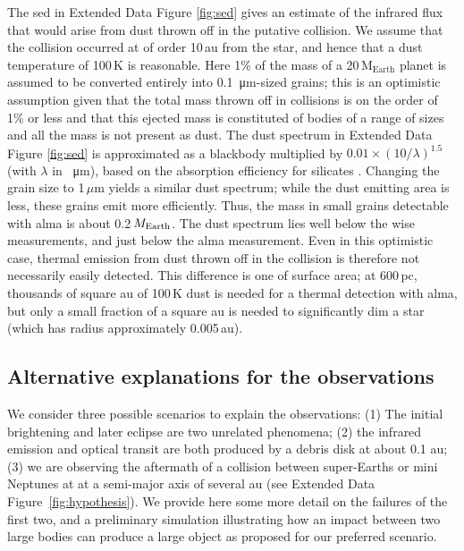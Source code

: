 \documentclass[sn-nature,oneside]{sn-jnl}%
\begin{document}
The  \gls{sed} in Extended Data Figure \ref{fig:sed} gives an estimate of the infrared flux that would arise from dust thrown off in the putative collision.
%
We assume that the collision occurred at of order 10\,au from the star, and hence that a dust temperature of 100\,K is reasonable.
%
Here 1\% of the mass of a 20\,$\mathrm{M_{Earth}}$ planet is assumed to be converted entirely into \SI{0.1}{\micro\metre}-sized grains; this is an optimistic assumption given that the total mass thrown off in collisions is on the order of 1\% or less \citep{2012ApJ...745...79L} and that this ejected mass is constituted of bodies of a range of sizes and all the mass is not present as dust.
%
The dust spectrum in Extended Data Figure \ref{fig:sed} is approximated as a blackbody multiplied by $0.01 \times (10 / \lambda)^{1.5}$ (with $\lambda$ in \SI{}{\micro\metre}), based on the absorption efficiency for silicates \citep{1993ApJ...402..441L}.
%
Changing the grain size to 1\,$\mu$m yields a similar dust spectrum; while the dust emitting area is less, these grains emit more efficiently.
%
Thus, the mass in small grains detectable with \gls{alma} is about 0.2\,$M_{\rm Earth}$.
%
The dust spectrum lies well below the \gls{wise} measurements, and just below the \gls{alma} measurement. %
Even in this optimistic case, thermal emission from dust thrown off in the collision is therefore not necessarily easily detected.
%
This difference is one of surface area; at 600\,pc, thousands of square au of 100\,K dust is needed for a thermal detection with \gls{alma}, but only a small fraction of a square au is needed to significantly dim a star (which has radius approximately 0.005\,au).

\subsection*{Alternative explanations for the observations}

We consider three possible scenarios to explain the observations: (1) The initial brightening and later eclipse are two unrelated phenomena;
%
(2) the infrared emission and optical transit are both produced by a debris disk at about 0.1 au;
%
(3) we are observing the aftermath of a collision between super-Earths or mini Neptunes at at a semi-major axis of several au (see Extended Data Figure~\ref{fig:hypothesis}).
%
We provide here some more detail on the failures of the first two, and a preliminary simulation illustrating how an impact between two large bodies can produce a large object as proposed for our preferred scenario. 
\end{document}
